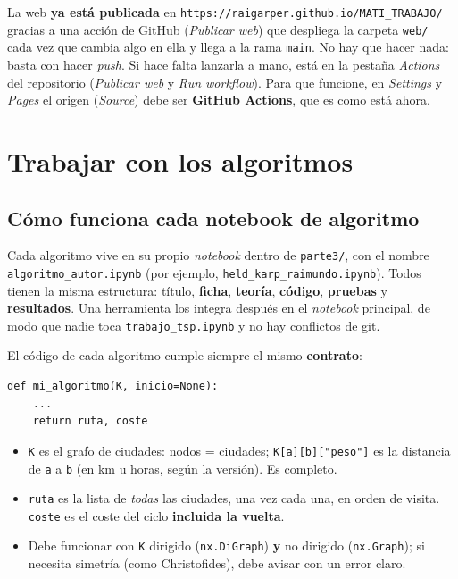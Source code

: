 \documentclass[11pt,a4paper,twoside,openany]{report}
\begin{document}
La web \textbf{ya está publicada} en \texttt{https://raigarper.github.io/MATI\_TRABAJO/} gracias a una acción de GitHub (\emph{Publicar web}) que despliega la carpeta \texttt{web/} cada vez que cambia algo en ella y llega a la rama \texttt{main}. No hay que hacer nada: basta con hacer \emph{push}. Si hace falta lanzarla a mano, está en la pestaña \emph{Actions} del repositorio (\emph{Publicar web} y \emph{Run workflow}). Para que funcione, en \emph{Settings} y \emph{Pages} el origen (\emph{Source}) debe ser \textbf{GitHub Actions}, que es como está ahora.

\chapter{Trabajar con los algoritmos}\label{g:algoritmos}

\section{Cómo funciona cada notebook de algoritmo}

Cada algoritmo vive en su propio \emph{notebook} dentro de \texttt{parte3/}, con el nombre \texttt{algoritmo\_autor.ipynb} (por ejemplo, \texttt{held\_karp\_raimundo.ipynb}). Todos tienen la misma estructura:
título, \textbf{ficha}, \textbf{teoría}, \textbf{código}, \textbf{pruebas} y \textbf{resultados}. Una herramienta los integra después en el \emph{notebook} principal, de modo que nadie toca \texttt{trabajo\_tsp.ipynb} y no hay conflictos de git.

El código de cada algoritmo cumple siempre el mismo \textbf{contrato}:

\begin{lstlisting}
def mi_algoritmo(K, inicio=None):
    ...
    return ruta, coste
\end{lstlisting}

\begin{itemize}
  \item \texttt{K} es el grafo de ciudades: nodos = ciudades; \texttt{K[a][b]["peso"]} es la distancia de \texttt{a} a \texttt{b} (en km u horas, según la versión). Es completo.
  \item \texttt{ruta} es la lista de \emph{todas} las ciudades, una vez cada una, en orden de visita. \texttt{coste} es el coste del ciclo \textbf{incluida la vuelta}.
  \item Debe funcionar con \texttt{K} dirigido (\texttt{nx.DiGraph}) \textbf{y} no dirigido (\texttt{nx.Graph}); si necesita simetría (como Christofides), debe avisar con un error claro.
\end{itemize}
\end{document}
